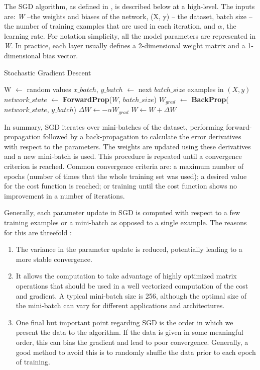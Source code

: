 The SGD algorithm, as defined in \cite{duda2012pattern}, is described below at a high-level. The inputs
are: \textit{W} --the weights and biases of the network, (X, y) -- the dataset, batch size -- the number of training examples that are used in each iteration, and $\alpha$, the learning rate. For notation simplicity, all the model parameters are represented in \textit{W}. In practice, each
layer usually defines a 2-dimensional weight matrix and a 1-dimensional bias vector.

\begin{algorithm}
\caption{Stochastic Gradient Descent}\label{euclid}
\begin{algorithmic}
\State	W $\longleftarrow$ random values
\Repeat
\State $x\_batch$, $y\_batch$ $\longleftarrow$ next $batch\_size$ examples in $(X, y)$
\State $network\_state$ $\longleftarrow$ \textbf{ForwardProp}($W$, $batch\_size$)
\State $W_{grad}$ $\longleftarrow$ \textbf{BackProp}($network\_state$, $y\_batch$)
\State $\Delta W \longleftarrow -\alpha W_{grad} $
\State $W \longleftarrow W + \Delta W$
\end{algorithmic}
\end{algorithm}

In summary, SGD iterates over mini-batches of the dataset, performing forward-propagation followed by a back-propagation to calculate the error derivatives with respect to the parameters. The weights are updated using these derivatives and a new mini-batch is used. This procedure is repeated until a convergence criterion is reached. Common convergence criteria are: a maximum number of epochs (number of times that the whole training set was used); a desired value for the cost function is reached; or training until the cost function shows no improvement in a number of iterations.

Generally, each parameter update in SGD is computed with respect to a few training examples or a mini-batch as opposed to a single example. The reasons for this are threefold \cite{sgd}:
\begin{enumerate}
	\item The variance in the parameter update is reduced, potentially leading to a more stable convergence. 
	\item It allows the computation to take advantage of highly optimized matrix operations that should be used in a well vectorized computation of the cost and gradient.  A typical mini-batch size is 256, although the optimal size of the mini-batch can vary for different applications and architectures.
	\item One final but important point regarding SGD is the order in which we present the data to the algorithm. If the data is given in some meaningful order, this can bias the gradient and lead to poor convergence. Generally, a good method to avoid this is to randomly shuffle the data prior to each epoch of training.
\end{enumerate}


